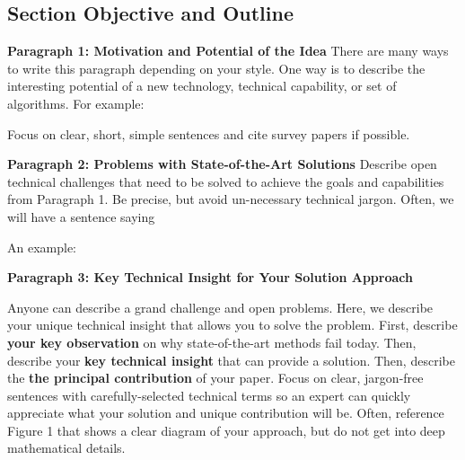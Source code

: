 \subsection{Section Objective and Outline}

\textbf{Paragraph 1: Motivation and Potential of the Idea}
There are many ways to write this paragraph depending on your style.
One way is to describe the interesting potential of a new technology, technical capability, or set of algorithms. For example: 

\begin{quote}
\end{quote}

Focus on clear, short, simple sentences and cite survey papers if possible.

\textbf{Paragraph 2: Problems with State-of-the-Art Solutions}
Describe open technical challenges that need to be solved to achieve the goals and capabilities from Paragraph 1. Be precise, but avoid un-necessary technical jargon. Often, we will have a sentence saying 

An example: 
\begin{quote}
\end{quote}

\textbf{Paragraph 3: Key Technical Insight for Your Solution Approach}

Anyone can describe a grand challenge and open problems. Here, we describe your unique technical insight that allows you to solve the problem. First, describe \textbf{your key observation} on why state-of-the-art methods fail today. Then, describe your \textbf{key technical insight} that can provide a solution.
Then, describe the \textbf{the principal contribution} of your paper. 
Focus on clear, jargon-free sentences with carefully-selected technical terms so an expert can quickly appreciate what your solution and unique contribution will be. Often, reference Figure 1 that shows a clear diagram of your approach, but do not get into deep mathematical details. 


